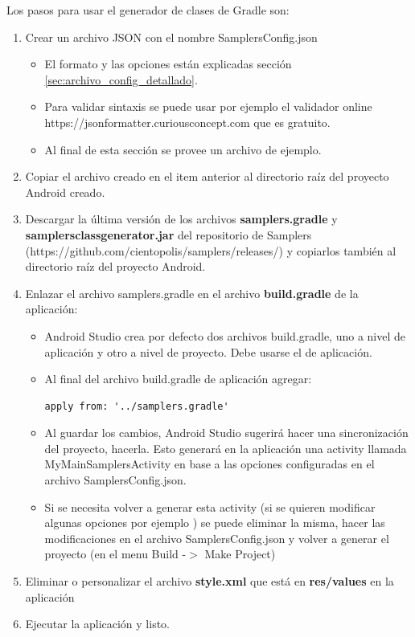 Los pasos para usar el generador de clases de Gradle son:
\begin{enumerate}
	\item Crear un archivo JSON con el nombre SamplersConfig.json
		\begin{itemize}
			\item El formato y las opciones están explicadas sección \ref{sec:archivo_config_detallado}.
			\item Para validar sintaxis se puede usar por ejemplo el validador online https://jsonformatter.curiousconcept.com que es gratuito.
			\item Al final de esta sección se provee un archivo de ejemplo.
		\end{itemize}
		
	\item Copiar el archivo creado en el item anterior al directorio raíz del proyecto Android creado.
	
	\item Descargar la última versión de los archivos \textbf{samplers.gradle} y \textbf{samplersclassgenerator.jar} del repositorio de Samplers (https://github.com/cientopolis/samplers/releases/) y copiarlos también al directorio raíz del proyecto Android.
	
	\item Enlazar el archivo samplers.gradle en el archivo \textbf{build.gradle} de la aplicación:
		\begin{itemize}
			\item Android Studio crea por defecto dos archivos build.gradle, uno a nivel de aplicación y otro a nivel de proyecto. Debe usarse el de aplicación.
			\item Al final del archivo build.gradle de aplicación agregar:
\begin{lstlisting}[language=XML, frame=tlb]
apply from: '../samplers.gradle'
\end{lstlisting}
			\item Al guardar los cambios, Android Studio sugerirá hacer una sincronización del proyecto, hacerla. Esto generará en la aplicación una activity llamada MyMainSamplersActivity en base a las opciones configuradas en el archivo SamplersConfig.json.
			\item Si se necesita volver a generar esta activity (si se quieren modificar algunas opciones por ejemplo ) se puede eliminar la misma, hacer las modificaciones en el archivo SamplersConfig.json y volver a generar el proyecto (en el menu Build -$>$ Make Project)
		\end{itemize}
		
	\item Eliminar o personalizar el archivo \textbf{style.xml} que está en \textbf{res/values} en la aplicación
	
	\item Ejecutar la aplicación y listo.

\end{enumerate}


